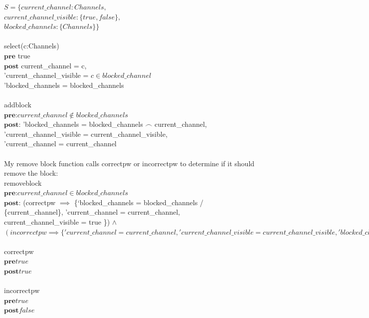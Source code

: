 \documentclass{article}
\begin{document}
\begin{enumerate}
$S = \{ current\_channel: Channels,$ \\
$ current\_channel\_visible: \{true, false\}, $ \\
$ blocked\_channels: \{Channels\}\}  $ \\
\\
select(c:Channels) \\
$\textbf{pre}$ true \\
$\textbf{post}$ current\_channel = c, \\
'current\_channel\_visible =  $c \in blocked\_channel$\\
'blocked\_channels = blocked\_channels \\
\\
addblock \\
$\textbf{pre:}   current\_channel \notin blocked\_channels $  \\
$\textbf{post:}$ 'blocked\_channels = blocked\_channels $\frown$ current\_channel,  \\
'current\_channel\_visible = current\_channel\_visible, \\
'current\_channel = current\_channel \\
\\
My remove block function calls correctpw or incorrectpw to determine if it should remove the block: \\ 
removeblock \\
$\textbf{pre:} current\_channel\in blocked\_channels$ \\
$\textbf{post:}$ (correctpw $\implies$ \{`blocked\_channels = blocked\_channels / \{current\_channel\}, 'current\_channel = current\_channel, current\_channel\_visible = true  \}) $\land$   \\
$(incorrectpw \implies \{'current\_channel = current\_channel, 'current\_channel\_visible = current\_channel\_visible, 'blocked\_channels = blocked\_channel \} ) $ \\
\\
correctpw \\
$\textbf{pre} true$ \\
$\textbf{post} true$ \\
\\
incorrectpw \\
$\textbf{pre} true$ \\
$\textbf{post} false$ \\
\\

\end{enumerate}
\end{document}
